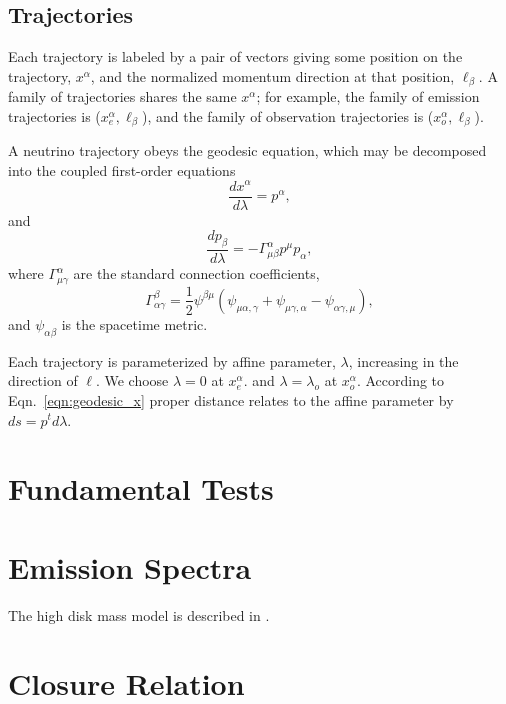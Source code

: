 \documentclass[aps,prd,twocolumn,superscriptaddress,groupedaddress]{revtex4}
\begin{document}
\subsection{Trajectories}
\label{ssc:trajectories}
Each trajectory is labeled by a pair of vectors
giving some position on the trajectory, $x^\alpha$,
and the normalized momentum direction at that position,
$\ell_\beta$.
A family of trajectories shares the same $x^\alpha$; for example,
the family of emission trajectories is ($x^\alpha_e,\ell_\beta$),
and the family of observation trajectories is ($x^\alpha_o,\ell_\beta$).

A neutrino trajectory obeys the geodesic equation, which may be decomposed into
the coupled first-order equations
\begin{equation}
\label{eqn:geodesic_x}
  \frac{d x^\alpha}{d\lambda} = p^\alpha,
\end{equation}
and
\begin{equation}
\label{eqn:geodesic_p}
  \frac{d p_\beta}{d\lambda} = -\Gamma^\alpha_{\mu\beta} p^\mu p_\alpha,
\end{equation}
where $\Gamma^\alpha_{\mu\gamma}$ are the standard connection coefficients,
\begin{equation}
  \label{eqn:christoffel}
  \Gamma^\beta_{\alpha\gamma} =
  \frac{1}{2} \psi^{\beta\mu}
  (\psi_{\mu\alpha,\gamma} + \psi_{\mu\gamma,\alpha} - \psi_{\alpha\gamma,\mu}),
\end{equation}
and $\psi_{\alpha\beta}$ is the spacetime metric.

Each trajectory is parameterized by affine parameter, $\lambda$, increasing in
the direction of $\ell$. We choose $\lambda=0$ at $x^\alpha_e$.
and $\lambda=\lambda_o$ at $x^\alpha_o$.
According to Eqn.~\ref{eqn:geodesic_x} proper distance relates to the affine
parameter by $ds=p^t d\lambda$.

\section{Fundamental Tests}

\section{Emission Spectra}
The high disk mass model is described in \cite{deat2013-leakage}.

\section{Closure Relation}
\end{document}
